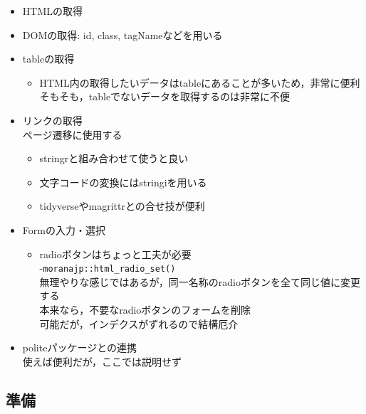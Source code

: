 \documentclass[
]{article}
\providecommand{\tightlist}{%
  \setlength{\itemsep}{0pt}\setlength{\parskip}{0pt}}
\begin{document}
\begin{itemize}
\tightlist
\item
  HTMLの取得\\
\item
  DOMの取得: id, class, tagNameなどを用いる\\
\item
  tableの取得

  \begin{itemize}
  \tightlist
  \item
    HTML内の取得したいデータはtableにあることが多いため，非常に便利\\
    そもそも，tableでないデータを取得するのは非常に不便\\
  \end{itemize}
\item
  リンクの取得\\
  ページ遷移に使用する

  \begin{itemize}
  \tightlist
  \item
    stringrと組み合わせて使うと良い\\
  \item
    文字コードの変換にはstringiを用いる\\
  \item
    tidyverseやmagrittrとの合せ技が便利\\
  \end{itemize}
\item
  Formの入力・選択

  \begin{itemize}
  \tightlist
  \item
    radioボタンはちょっと工夫が必要\\
    -\texttt{moranajp::html\_radio\_set()}\\
    無理やりな感じではあるが，同一名称のradioボタンを全て同じ値に変更する\\
    本来なら，不要なradioボタンのフォームを削除\\
    可能だが，インデクスがずれるので結構厄介\\
  \end{itemize}
\item
  politeパッケージとの連携\\
  使えば便利だが，ここでは説明せず
\end{itemize}

\hypertarget{ux6e96ux5099-9}{%
\subsection{準備}\label{ux6e96ux5099-9}}
\end{document}
